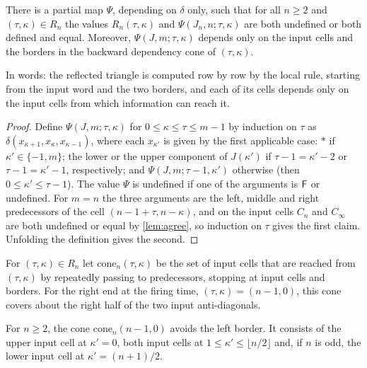 \begin{lemma}[determinacy]\label{lem:determinacy}
There is a partial map $\Psi$, depending on $\delta$ only, such that for all
$n\ge2$ and $(\tau,\kappa)\in R_n$ the values $R_n(\tau,\kappa)$ and
$\Psi(J_n,n;\tau,\kappa)$ are both undefined or both defined and equal.
Moreover, $\Psi(J,m;\tau,\kappa)$ depends only on the input cells and the
borders in the backward dependency cone of $(\tau,\kappa)$.
\end{lemma}

In words: the reflected triangle is computed row by row by the local rule,
starting from the input word and the two borders, and each of its cells depends
only on the input cells from which information can reach it.

\begin{proof}
Define $\Psi(J,m;\tau,\kappa)$ for $0\le\kappa\le\tau\le m-1$ by induction on
$\tau$ as $\delta(x_{\kappa+1},x_\kappa,x_{\kappa-1})$, where each $x_{\kappa'}$
is given by the first applicable case: $\ast$ if $\kappa'\in\{-1,m\}$; the lower
or the upper component of $J(\kappa')$ if $\tau-1=\kappa'-2$ or
$\tau-1=\kappa'-1$, respectively; and $\Psi(J,m;\tau-1,\kappa')$ otherwise (then
$0\le\kappa'\le\tau-1$). The value $\Psi$ is undefined if one of the arguments
is $\mathsf F$ or undefined. For $m=n$ the three arguments are the left, middle and
right predecessors of the cell $(n-1+\tau,n-\kappa)$, and on the input cells
$C_n$ and $C_\infty$ are both undefined or equal by \cref{lem:agree}, so
induction on $\tau$ gives the first claim. Unfolding the definition gives the
second.
\end{proof}

For $(\tau,\kappa)\in R_n$ let $\mathrm{cone}_n(\tau,\kappa)$ be the set of input
cells that are reached from $(\tau,\kappa)$ by repeatedly passing to
predecessors, stopping at input cells and borders. For the right end at the
firing time, $(\tau,\kappa)=(n-1,0)$, this cone covers about the right half of
the two input anti-diagonals.

\begin{lemma}\label{lem:cone}
For $n\ge2$, the cone $\mathrm{cone}_n(n-1,0)$ avoids the left border. It
consists of the upper input cell at $\kappa'=0$, both input cells at
$1\le\kappa'\le\lfloor n/2\rfloor$ and, if $n$ is odd, the lower input cell at
$\kappa'=(n+1)/2$.
\end{lemma}

